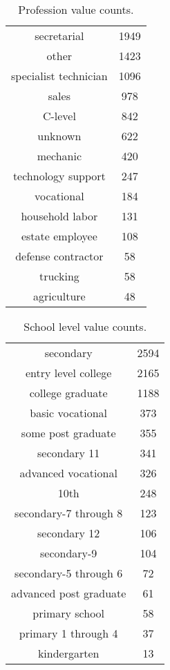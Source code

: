 \begin{table}[!h]
    \caption{Profession value counts.}
    \label{tab:profession_value_counts}
    \begin{tabular}{cc}
        secretarial & 1949 \\
        other & 1423 \\
        specialist technician & 1096 \\
        sales & 978 \\
        C-level & 842 \\
        unknown & 622 \\
        mechanic & 420 \\
        technology support & 247 \\
        vocational & 184 \\
        household labor & 131 \\
        estate employee & 108 \\
        defense contractor & 58 \\
        trucking & 58 \\
        agriculture & 48 \\
    \end{tabular}
    \centering
\end{table}

\begin{table}[!h]
    \caption{School level value counts.}
    \label{tab:school_level_value_counts}
    \centering
    \begin{tabular}{cc}
        secondary & 2594 \\
        entry level college & 2165 \\
        college graduate & 1188 \\
        basic vocational & 373 \\
        some post graduate & 355 \\
        secondary 11 & 341 \\
        advanced vocational & 326 \\
        10th & 248 \\
        secondary-7 through 8 & 123 \\
        secondary 12 & 106 \\
        secondary-9 & 104 \\
        secondary-5 through 6 & 72 \\
        advanced post graduate & 61 \\
        primary school & 58 \\
        primary 1 through 4 & 37 \\
        kindergarten & 13 \\
    \end{tabular}
\end{table}

